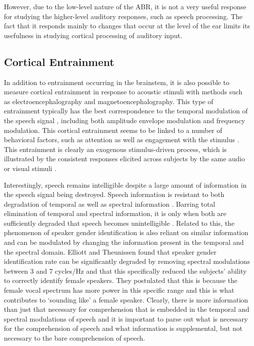 \documentclass[titlepage]{article}
\begin{document}
    However, due to the low-level nature of the ABR, it is not a very useful 
    response for studying the higher-level auditory responses, such as speech 
    processing. The fact that it responds mainly to changes that occur at the 
    level of the ear limits its usefulness in studying cortical processing of 
    auditory input.

  \subsection{Cortical Entrainment} \label{corticalEntrainment}

    In addition to entrainment occurring in the brainstem, it is also possible
    to measure cortical entrainment in response to acoustic stimuli with methods
    such as electroencephalography and magnetoencephalography. This type of
    entrainment typically has the best correspondence to the temporal
    modulation of the speech signal
    \cite{Ding2014a,Ding2014,Nourski2009,Horton2014}, including both amplitude
    envelope modulation and frequency modulation. This cortical entrainment
    seems to be linked to a number of behavioral factors, such as attention
    \cite{Dmochowski2016,ZionGolumbic2013} as well as engagement with the
    stimulus \cite{Dmochowski2017}. This entrainment is clearly an exogenous
    stimulus-driven process, which is illustrated by the consistent responses
    elicited across subjects by the same audio or visual stimuli
    \cite{Cohen2017,Petroni2017}.

    Interestingly, speech remains intelligible despite a large amount of
    information in the speech signal being destroyed. Speech information is
    resistant to both degradation of temporal as well as spectral information
    \cite{Silipo1999,Drullman1994}. Barring total elimination of temporal and
    spectral information, it is only when both are sufficiently degraded that
    speech becomes unintelligible \cite{Elliott2009}. Related to this, the
    phenomenon of speaker gender identification is also reliant on similar
    information and can be modulated by changing the information present in the
    temporal and the spectral domain. Elliott and Theunissen \cite{Elliott2009}
    found that speaker gender identification rate can be significantly
    degraded by removing spectral modulations between 3 and 7 cycles/Hz and that
    this specifically reduced the subjects' ability to correctly identify
    female speakers. They postulated that this is because the female vocal
    spectrum has more power in this specific range and this is what
    contributes to `sounding like' a female speaker. Clearly, there is more
    information than just that necessary for comprehension that is embedded
    in the temporal and spectral modulations of speech and it is important to
    parse out what is necessary for the comprehension of speech and what
    information is supplemental, but not necessary to the bare comprehension
    of speech.
\end{document}

